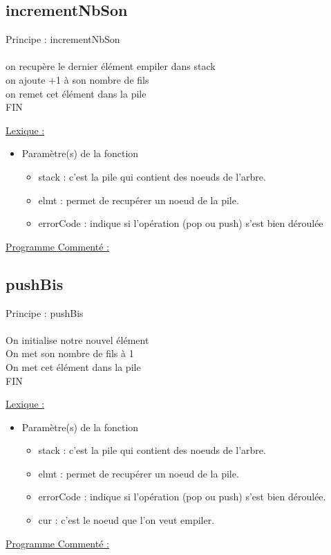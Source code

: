 \documentclass[a4paper]{article}
\newcommand\tab[1][1cm]{\hspace*{#1}}
\begin{document}


\newpage
\subsection{incrementNbSon}

\begin{algorithm}
Principe :  incrementNbSon
\\
\\
\tab on recupère le dernier élément empiler dans stack
\\
\tab on ajoute +1 à son nombre de fils
\\
\tab on remet cet élément dans la pile
\\
FIN
\end{algorithm}
\underline{Lexique :}
\begin{itemize}
\item Paramètre(s) de la fonction  
\begin{itemize}
\item stack : c'est la pile qui contient des noeuds de l'arbre.
\item elmt : permet de recupérer un noeud de la pile.
\item errorCode : indique si l'opération (pop ou push) s'est bien déroulée
\end{itemize}
\end{itemize}
\underline{Programme Commenté :}




\subsection{pushBis}
\begin{algorithm}
Principe : pushBis
\\
\\
\tab On initialise notre nouvel élément
\\
\tab On met son nombre de fils à 1
\\
\tab On met cet élément dans la pile
\\
FIN
\end{algorithm}
\underline{Lexique :}
\begin{itemize}
\item Paramètre(s) de la fonction  
\begin{itemize}
\item stack : c'est la pile qui contient des noeuds de l'arbre.
\item elmt : permet de recupérer un noeud de la pile.
\item errorCode : indique si l'opération (pop ou push) s'est bien déroulée.
\item cur : c'est le noeud que l'on veut empiler.
\end{itemize}
\end{itemize}
\underline{Programme Commenté :}
\end{document}
